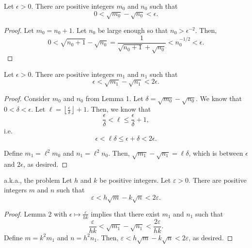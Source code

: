 \begin{sol}{}{}
	\begin{lem}{}{}
	Let $\epsilon >0$. There are positive integers $m_0$ and $n_0$ such that \[0 < \sqrt{m_0}-\sqrt{n_0} < \epsilon.\]
	\end{lem}
	\begin{proof}
		Let \(m_0 = n_0 + 1\). Let \(n_0\) be large enough so that \(n_0 > \epsilon^{-2}\). Then, \[
			0 < \sqrt{n_0 + 1} - \sqrt{n_0} = \frac{1}{\sqrt{n_0+1} + \sqrt{n_0}} < n_0^{-1/2} < \epsilon.
		\]
	\end{proof}
	\begin{lem}{}{}
	Let $\epsilon >0$. There are positive integers $m_1$ and $n_1$ such that \[\epsilon < \sqrt{m_1}-\sqrt{n_1} < 2\epsilon.\]
	\end{lem}
	\begin{proof}
		Consider \(m_0\) and \(n_0\) from Lemma 1. Let \(\delta = \sqrt{m_0} - \sqrt{n_0}\). We know that \(0 < \delta < \epsilon\). Let  \(\ell = \left\lfloor\frac{\epsilon}{\delta}\right\rfloor + 1\). Then, we know that \[
			\frac{\epsilon}{\delta} < \ell \leq \frac{\epsilon}{\delta} + 1,
		\]
		i.e.
		\[
			\epsilon < \ell \delta \leq \epsilon + \delta < 2\epsilon.
		\]

		Define \(m_1 = \ell^2 m_0\) and \(n_1 = \ell^2 n_0\). Then, \(\sqrt{m_1} - \sqrt{n_1} = \ell\delta\), which is between \(\epsilon\) and \(2\epsilon\), as desired.
	\end{proof}
	\begin{lem}{a.k.a., the problem}{}
	Let $h$ and $k$ be positive integers. Let \(\varepsilon > 0\). There are positive integers $m$ and $n$ such that \[\varepsilon < h\sqrt{m}-k\sqrt{n}<2\varepsilon.\]
	\end{lem}
	\begin{proof}
		Lemma 2 with \(\epsilon \mapsto \frac{\varepsilon}{hk}\) implies that there exist \(m_1\) and \(n_1\) such that \[
			\frac{\varepsilon}{hk} < \sqrt{m_1} - \sqrt{n_1} < \frac{2\varepsilon}{hk}.
		\]
		Define \(m = k^2m_1\) and  \(n = h^2n_1\). Then, \( \varepsilon < h\sqrt{m} - k\sqrt{n} < 2\varepsilon\), as desired.
	\end{proof}
\end{sol}

